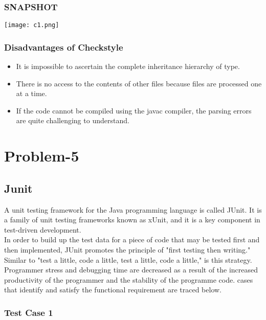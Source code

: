 \documentclass[a4paper,12pt]{article}
\begin{document}
\subsubsection{SNAPSHOT}
\texttt{[image: c1.png]}\\[1cm]

\subsubsection{Disadvantages of Checkstyle}
\begin{itemize}
    \item It is impossible to ascertain the complete inheritance hierarchy of type.
    \item There is no access to the contents of other files because files are processed one at a time.
    \item If the code cannot be compiled using the javac compiler, the parsing errors are quite challenging to understand.
\end{itemize}



\newpage
\section{\bfseries\huge\centering Problem-5}
\subsection{Junit}
A unit testing framework for the Java programming language is called JUnit. It is a family of unit testing frameworks known as xUnit, and it is a key component in test-driven development.\\

In order to build up the test data for a piece of code that may be tested first and then implemented, JUnit promotes the principle of "first testing then writing." Similar to "test a little, code a little, test a little, code a little," is this strategy. Programmer stress and debugging time are decreased as a result of the increased productivity of the programmer and the stability of the programme code. cases that identify and satisfy the functional requirement are traced below. 
\newline

\subsubsection{\textbf{Test Case 1}}\newline
\end{document}
